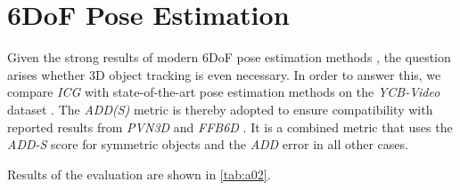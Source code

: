\documentclass[10pt,twocolumn,letterpaper]{article}
\begin{document}
\section{6DoF Pose Estimation}\label{sec:a3}
Given the strong results of modern \acs{6DoF} pose estimation methods \cite{Labbe2020, He2021}, the question arises whether 3D object tracking is even necessary.
In order to answer this, we compare \textit{ICG} with state-of-the-art pose estimation methods on the \textit{YCB-Video} dataset \cite{Xiang2018}.
The \textit{ADD(S)} metric is thereby adopted to ensure compatibility with reported results from \textit{PVN3D} \cite{He2020} and \textit{FFB6D} \cite{He2021}.
It is a combined metric that uses the \textit{ADD-S} score for symmetric objects and the \textit{ADD} error in all other cases.

Results of the evaluation are shown in \cref{tab:a02}.
\end{document}
